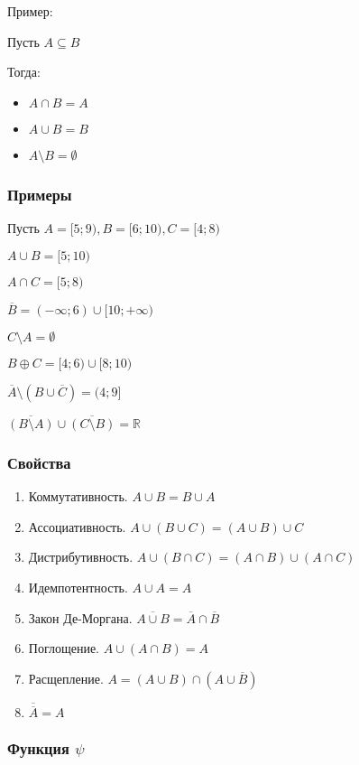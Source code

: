 \documentclass{article}
\begin{document}
Пример:

Пусть $A \subseteq B$

Тогда:
\begin{itemize}
	\item $A \cap B = A$
	\item $A \cup B = B$
	\item $A \setminus B = \emptyset$
\end{itemize}

\subsubsection{Примеры}

Пусть $A = [5; 9), B = [6; 10), C = [4; 8)$

$A \cup B = [5; 10)$

$A \cap C = [5; 8)$

$\overline{B} = (-\infty; 6) \cup [10; +\infty)$

$C \setminus A = \emptyset$

$B \oplus C = [4; 6) \cup [8; 10)$

$\overline{A} \setminus (B \cup \overline{C}) = (4; 9]$

$\overline{(B \setminus A)} \cup \overline{(C \setminus B)} = \mathbb{R}$

\subsubsection{Свойства}

\begin{enumerate}
	\item Коммутативность. $A \cup B = B \cup A$
	\item Ассоциативность. $A \cup (B \cup C) = (A \cup B) \cup C$
	\item Дистрибутивность. $A \cup (B \cap C) = (A \cap B) \cup (A \cap C)$
	\item Идемпотентность. $A \cup A = A$
	\item Закон Де-Моргана. $\overline{A \cup B} = \overline{A} \cap \overline{B}$
	\item Поглощение. $A \cup (A \cap B) = A$
	\item Расщепление. $A = (A \cup B) \cap (A \cup \overline{B})$
	\item $\overline{\overline{A}} = A$
\end{enumerate}

\subsubsection{Функция $\psi$}
\end{document}
